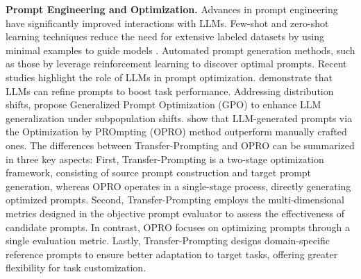 \noindent\textbf{Prompt Engineering and Optimization.} Advances in prompt engineering have significantly improved interactions with LLMs. Few-shot and zero-shot learning techniques reduce the need for extensive labeled datasets by using minimal examples to guide models \citep{brown2020language}. Automated prompt generation methods, such as those by \citep{liu2023pre}leverage reinforcement learning to discover optimal prompts.
Recent studies highlight the role of LLMs in prompt optimization. \citep{ma2024large} demonstrate that LLMs can refine prompts to boost task performance. Addressing distribution shifts, \citep{li2023robust} propose Generalized Prompt Optimization (GPO) to enhance LLM generalization under subpopulation shifts.  \citep{yang2024largelanguagemodelsoptimizers} show that LLM-generated prompts via the Optimization by PROmpting (OPRO) method outperform manually crafted ones.
The differences between Transfer-Prompting and OPRO can be summarized in three key aspects: First, Transfer-Prompting is a two-stage optimization framework, consisting of source prompt construction and target prompt generation, whereas OPRO operates in a single-stage process, directly generating optimized prompts. Second, Transfer-Prompting employs the multi-dimensional metrics designed in the objective prompt evaluator to assess the effectiveness of candidate prompts. In contrast, OPRO focuses on optimizing prompts through a single evaluation metric. Lastly, Transfer-Prompting designs domain-specific reference prompts to ensure better adaptation to target tasks, offering greater flexibility for task customization.

